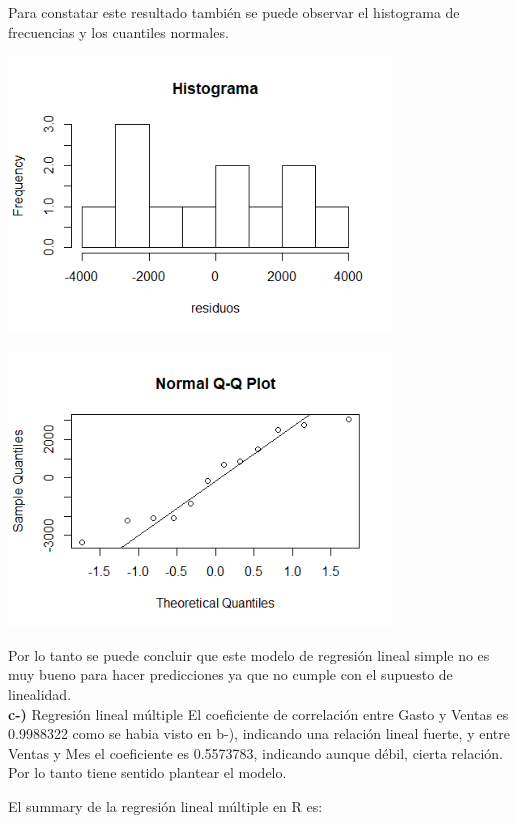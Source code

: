\documentclass[12pt,a4paper]{article}
\begin{document}
	Para constatar este resultado también se puede observar el histograma de frecuencias y los cuantiles normales.
	
	\begin{center}
		\includegraphics[width=4in]{./images/PLOT3.png}
	\end{center}
	
	\begin{center}
		\includegraphics[width=4in]{./images/PLOT4.png}
	\end{center}
	
	Por lo tanto se puede concluir que este modelo de regresión lineal simple no es muy bueno para hacer predicciones ya que no cumple con el supuesto de linealidad.\\

	\textbf{c-)} Regresión lineal múltiple
	El coeficiente de correlación entre Gasto y Ventas es 0.9988322 como se habia visto en b-), indicando una relación lineal fuerte, y entre Ventas y Mes el coeficiente es 0.5573783, indicando aunque débil, cierta relación. Por lo tanto tiene sentido plantear el modelo.
	
	El summary de la regresión lineal múltiple en R es:\\
	
\end{document}
